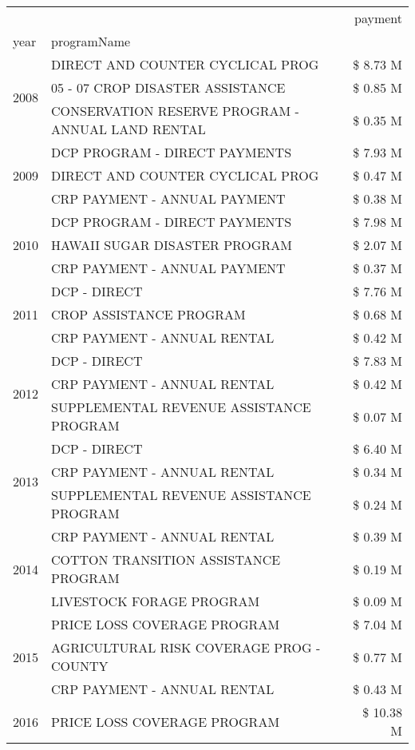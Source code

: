 \begin{tabular}{llr}
\toprule
 &  & payment \\
year & programName &  \\
\midrule
\multirow[t]{3}{*}{2008} & DIRECT AND COUNTER CYCLICAL PROG & \$ 8.73 M \\
 & 05 - 07 CROP DISASTER ASSISTANCE & \$ 0.85 M \\
 & CONSERVATION RESERVE PROGRAM - ANNUAL LAND RENTAL & \$ 0.35 M \\
\cline{1-3}
\multirow[t]{3}{*}{2009} & DCP PROGRAM - DIRECT PAYMENTS & \$ 7.93 M \\
 & DIRECT AND COUNTER CYCLICAL PROG & \$ 0.47 M \\
 & CRP PAYMENT - ANNUAL PAYMENT & \$ 0.38 M \\
\cline{1-3}
\multirow[t]{3}{*}{2010} & DCP PROGRAM - DIRECT PAYMENTS & \$ 7.98 M \\
 & HAWAII SUGAR DISASTER PROGRAM & \$ 2.07 M \\
 & CRP PAYMENT - ANNUAL PAYMENT & \$ 0.37 M \\
\cline{1-3}
\multirow[t]{3}{*}{2011} & DCP - DIRECT & \$ 7.76 M \\
 & CROP ASSISTANCE PROGRAM & \$ 0.68 M \\
 & CRP PAYMENT - ANNUAL RENTAL & \$ 0.42 M \\
\cline{1-3}
\multirow[t]{3}{*}{2012} & DCP - DIRECT & \$ 7.83 M \\
 & CRP PAYMENT - ANNUAL RENTAL & \$ 0.42 M \\
 & SUPPLEMENTAL REVENUE ASSISTANCE PROGRAM & \$ 0.07 M \\
\cline{1-3}
\multirow[t]{3}{*}{2013} & DCP - DIRECT & \$ 6.40 M \\
 & CRP PAYMENT - ANNUAL RENTAL & \$ 0.34 M \\
 & SUPPLEMENTAL REVENUE ASSISTANCE PROGRAM & \$ 0.24 M \\
\cline{1-3}
\multirow[t]{3}{*}{2014} & CRP PAYMENT - ANNUAL RENTAL & \$ 0.39 M \\
 & COTTON TRANSITION ASSISTANCE PROGRAM & \$ 0.19 M \\
 & LIVESTOCK FORAGE PROGRAM & \$ 0.09 M \\
\cline{1-3}
\multirow[t]{3}{*}{2015} & PRICE LOSS COVERAGE PROGRAM & \$ 7.04 M \\
 & AGRICULTURAL RISK COVERAGE PROG - COUNTY & \$ 0.77 M \\
 & CRP PAYMENT - ANNUAL RENTAL & \$ 0.43 M \\
\cline{1-3}
\multirow[t]{3}{*}{2016} & PRICE LOSS COVERAGE PROGRAM                   & \$ 10.38 M \\

\end{tabular}
